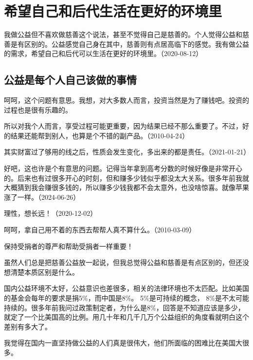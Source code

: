 
\section{希望自己和后代生活在更好的环境里}

我做公益但不喜欢做慈善这个说法，甚至不觉得自己是慈善的。个人觉得公益和慈善是有区别的。公益感觉自己身在其中，慈善则有点居高临下的感觉。我有做公益的需求，希望自己和后代可以生活在更好的环境里。（2020-08-12）

\subsection{公益是每个人自己该做的事情}


呵呵，这个问题有意思。我想，对大多数人而言，投资当然是为了赚钱吧。投资的过程也是很有乐趣的。

所以对我个人而言，享受过程可能更重要，因为结果已经不那么重要了。不过，好的结果还能帮到别人，也算是个不错的副产品。（2010-04-24）

其实财富过了够用的线之后，性质会发生变化，多出来的都是责任。（2021-01-21）


好吧，这也许是个有意思的问题。记得当年拿到高考分数的时候好像是非常开心的。后来也有过很多开心的时刻，但和赚多少钱似乎都没太大关系。很多年前我就大概猜到我会赚很多钱的，所以赚多少钱我都不会太意外，也没啥惊喜。就像苹果涨了一样。（2024-06-26）


理性，想长远！（2020-12-02）


呵呵，拿自己用不着的东西去帮帮人真不算什么。（2010-03-09）

保持受捐者的尊严和帮助受捐者一样重要！

虽然人们总是把慈善公益放一起说，但我总觉得公益和慈善是有点区别的，但还没想清楚本质区别是什么。

国内公益环境不太好，公益意识也差很多，相关的法律环境也不太匹配。比如美国的基金会每年的要求是捐5\%，而中国是8\%。 5\%是可持续的概念， 8\%是不太可能持续的。很多年前我问过政策制定者，为什么是8\%，回答是不知道应该是多少，就定了一个比美国高的比例。用几十年和几千几万个公益组织的角度看就明白这个差别有多大了。

我觉得在国内一直坚持做公益的人们真是很伟大，他们所面临的困难比在美国大很多。

